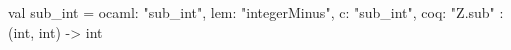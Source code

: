 val sub_int = {ocaml: "sub_int", lem: "integerMinus", c: "sub_int", coq: "Z.sub"} : (int, int) -> int
